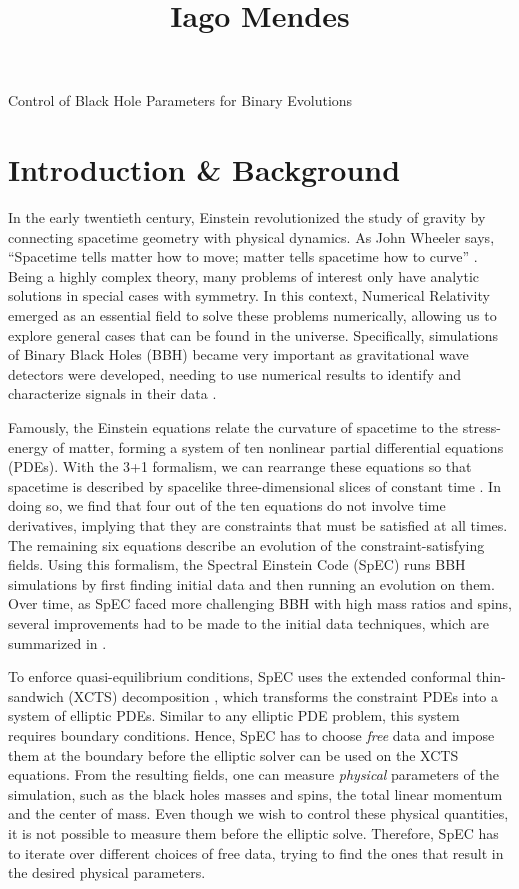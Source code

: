 \documentclass{../document}
\begin{document}
	\title
		[Caltech SURF Proposal]
		{Iago Mendes}
		{Control of Black Hole Parameters for Binary Evolutions}

	\section{Introduction \& Background}

	In the early twentieth century, Einstein revolutionized the study of gravity by connecting spacetime geometry with physical dynamics. As John Wheeler says, ``Spacetime tells matter how to move; matter tells spacetime how to curve'' \cite{Wheeler}. Being a highly complex theory, many problems of interest only have analytic solutions in special cases with symmetry. In this context, Numerical Relativity emerged as an essential field to solve these problems numerically, allowing us to explore general cases that can be found in the universe. Specifically, simulations of Binary Black Holes (BBH) became very important as gravitational wave detectors were developed, needing to use numerical results to identify and characterize signals in their data \cite{LIGO}.

	Famously, the Einstein equations relate the curvature of spacetime to the stress-energy of matter, forming a system of ten nonlinear partial differential equations (PDEs). With the 3+1 formalism, we can rearrange these equations so that spacetime is described by spacelike three-dimensional slices of constant time \cite{Alcubierre}. In doing so, we find that four out of the ten equations do not involve time derivatives, implying that they are constraints that must be satisfied at all times. The remaining six equations describe an evolution of the constraint-satisfying fields. Using this formalism, the Spectral Einstein Code (SpEC) \cite{SpEC} runs BBH simulations by first finding initial data and then running an evolution on them. Over time, as SpEC faced more challenging BBH with high mass ratios and spins, several improvements had to be made to the initial data techniques, which are summarized in \cite{Serguei}.
	
	To enforce quasi-equilibrium conditions, SpEC uses the extended conformal thin-sandwich (XCTS) decomposition \cite{Serguei}, which transforms the constraint PDEs into a system of elliptic PDEs. Similar to any elliptic PDE problem, this system requires boundary conditions. Hence, SpEC has to choose \textit{free} data and impose them at the boundary before the elliptic solver can be used on the XCTS equations. From the resulting fields, one can measure \textit{physical} parameters of the simulation, such as the black holes masses and spins, the total linear momentum and the center of mass. Even though we wish to control these physical quantities, it is not possible to measure them before the elliptic solve. Therefore, SpEC has to iterate over different choices of free data, trying to find the ones that result in the desired physical parameters.
	
\end{document}
